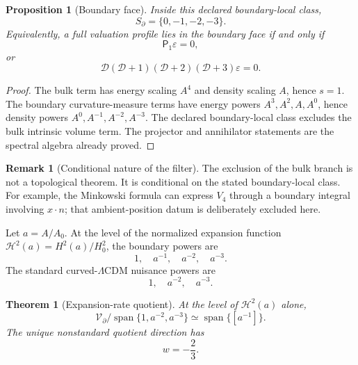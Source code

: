 \documentclass[aps,prd,reprint,onecolumn,nofootinbib,superscriptaddress,showkeys]{revtex4-2}
\numberwithin{equation}{section}
\theoremstyle{definition}
\newtheorem{remark}{Remark}[section]
\theoremstyle{plain}
\newtheorem{theorem}{Theorem}[section]
\newtheorem{proposition}{Proposition}[section]
\newcommand{\Dil}{\mathscr D}
\newcommand{\spanop}{\operatorname{span}}
\begin{document}
\begin{proposition}[Boundary face]
Inside this declared boundary-local class,
\begin{equation}
S_\partial=\{0,-1,-2,-3\}.
\end{equation}
Equivalently, a full valuation profile lies in the boundary face if and only if
\begin{equation}
\mathsf P_1\varepsilon=0,
\end{equation}
or
\begin{equation}
\Dil(\Dil+1)(\Dil+2)(\Dil+3)\varepsilon=0.
\end{equation}
\end{proposition}

\begin{proof}
The bulk term has energy scaling \(A^4\) and density scaling \(A\), hence \(s=1\).  The boundary curvature-measure terms have energy powers \(A^3,A^2,A,A^0\), hence density powers \(A^0,A^{-1},A^{-2},A^{-3}\).  The declared boundary-local class excludes the bulk intrinsic volume term.  The projector and annihilator statements are the spectral algebra already proved.
\end{proof}

\begin{remark}[Conditional nature of the filter]
The exclusion of the bulk branch is not a topological theorem.  It is conditional on the stated boundary-local class.  For example, the Minkowski formula can express \(V_4\) through a boundary integral involving \(x\cdot n\); that ambient-position datum is deliberately excluded here.
\end{remark}

Let \(a=A/A_0\).  At the level of the normalized expansion function \(\mathcal H^2(a)=H^2(a)/H_0^2\), the boundary powers are
\begin{equation}
1,\quad a^{-1},\quad a^{-2},\quad a^{-3}.
\end{equation}
The standard curved-\(\Lambda\)CDM nuisance powers are
\begin{equation}
1,\quad a^{-2},\quad a^{-3}.
\end{equation}

\begin{theorem}[Expansion-rate quotient]
At the level of \(\mathcal H^2(a)\) alone,
\begin{equation}
\mathcal V_\partial/
\spanop\{1,a^{-2},a^{-3}\}
\simeq
\spanop\{[a^{-1}]\}.
\end{equation}
The unique nonstandard quotient direction has
\begin{equation}
w=-\frac23.
\end{equation}
\end{theorem}
\end{document}
